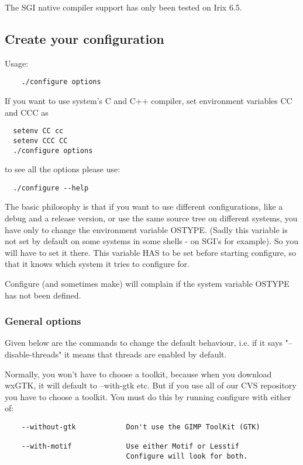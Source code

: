 The SGI native compiler support has only been tested on Irix 6.5.

\subsection{Create your configuration}

Usage:

\begin{verbatim}
	./configure options
\end{verbatim}

If you want to use system's C and C++ compiler,
set environment variables CC and CCC as

\begin{verbatim}
  setenv CC cc
  setenv CCC CC
  ./configure options
\end{verbatim}

to see all the options please use:

\begin{verbatim}
  ./configure --help
\end{verbatim}

The basic philosophy is that if you want to use different
configurations, like a debug and a release version, 
or use the same source tree on different systems,
you have only to change the environment variable OSTYPE.
(Sadly this variable is not set by default on some systems
in some shells - on SGI's for example). So you will have to 
set it there. This variable HAS to be set before starting 
configure, so that it knows which system it tries to 
configure for.

Configure (and sometimes make) will complain if the system variable OSTYPE has 
not been defined.

\subsubsection{General options}

Given below are the commands to change the default behaviour,
i.e. if it says "--disable-threads" it means that threads
are enabled by default.

Normally, you won't have to choose a toolkit, because when
you download wxGTK, it will default to --with-gtk etc. But
if you use all of our CVS repository you have to choose a 
toolkit. You must do this by running configure with either of:

\begin{verbatim}
    --without-gtk            Don't use the GIMP ToolKit (GTK)
	
	--with-motif             Use either Motif or Lesstif
	                         Configure will look for both. 
\end{verbatim}

